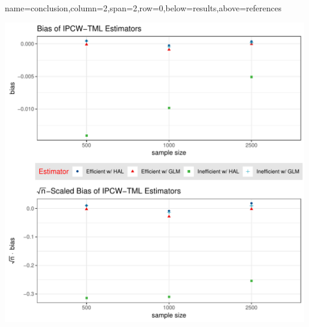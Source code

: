 \documentclass[landscape,a0paper,fontscale=0.285]{baposter} %
\begin{document}
\begin{poster}

{name=conclusion,column=2,span=2,row=0,below=results,above=references}{

\vspace{0.25em}
\begin{multicols}{2}

\begin{center}
\vspace*{-0.5cm}
\includegraphics[scale=0.37]{bias_composed_plot}
\end{center}




\end{multicols}}
\end{poster}
\end{document}
